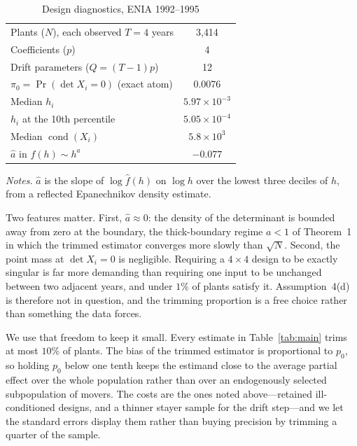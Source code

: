 \documentclass{article}
\begin{document}
\begin{table}[t]
\centering
\caption{Design diagnostics, ENIA 1992--1995}
\label{tab:design}
\begin{tabular}{lc}
\toprule
Plants ($N$), each observed $T = 4$ years        & 3{,}414 \\
Coefficients ($p$)                               & 4 \\
Drift parameters ($Q = (T-1)p$)                  & 12 \\
$\pi_0 = \Pr(\det X_i = 0)$ (exact atom)         & 0.0076 \\
Median $h_i$                                     & $5.97 \times 10^{-3}$ \\
$h_i$ at the 10th percentile                     & $5.05 \times 10^{-4}$ \\
Median $\operatorname{cond}(X_i)$                & $5.8 \times 10^{3}$ \\
$\hat a$ in $f(h) \sim h^{a}$                    & $-0.077$ \\
\bottomrule
\end{tabular}

\vspace{0.6em}
\begin{minipage}{0.92\textwidth}
\footnotesize \emph{Notes.} $\hat a$ is the slope of $\log \hat f(h)$ on
$\log h$ over the lowest three deciles of $h$, from a reflected Epanechnikov
density estimate.
\end{minipage}
\end{table}

Two features matter. First, $\hat a \approx 0$: the density of the determinant
is bounded away from zero at the boundary, the thick-boundary regime $a < 1$ of
Theorem~1 in which the trimmed estimator converges more slowly than $\sqrt N$.
Second, the point mass at $\det X_i = 0$ is negligible. Requiring a
$4 \times 4$ design to be exactly singular is far more demanding than requiring
one input to be unchanged between two adjacent years, and under $1\%$ of plants
satisfy it. Assumption~4(d) is therefore not in question, and the trimming
proportion is a free choice rather than something the data forces.

We use that freedom to keep it small. Every estimate in Table~\ref{tab:main}
trims at most $10\%$ of plants. The bias of the trimmed estimator is
proportional to $p_0$, so holding $p_0$ below one tenth keeps the estimand
close to the average partial effect over the whole population rather than over
an endogenously selected subpopulation of movers. The costs are the ones noted
above---retained ill-conditioned designs, and a thinner stayer sample for the
drift step---and we let the standard errors display them rather than buying
precision by trimming a quarter of the sample.
\end{document}
